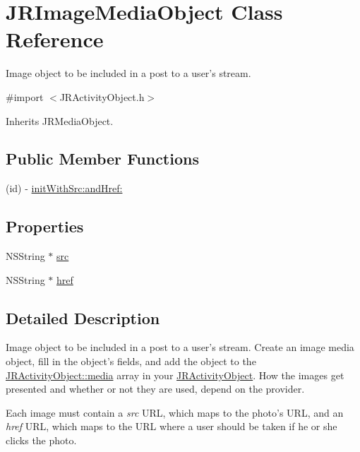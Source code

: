 \hypertarget{interface_j_r_image_media_object}{
\section{JRImageMediaObject Class Reference}
\label{interface_j_r_image_media_object}
}


Image object to be included in a post to a user's stream.  




{\ttfamily \#import $<$JRActivityObject.h$>$}



Inherits JRMediaObject.

\subsection*{Public Member Functions}
\begin{DoxyCompactItemize}
\item 
(id) -\/ \hyperlink{interface_j_r_image_media_object_a8a15f579b784dbdcdaeea9dc1da56cb3}{initWithSrc:andHref:}
\end{DoxyCompactItemize}
\subsection*{Properties}
\begin{DoxyCompactItemize}
\item 
NSString $\ast$ \hyperlink{interface_j_r_image_media_object_aad75823f9189dfca758bc4d4712c3621}{src}
\item 
NSString $\ast$ \hyperlink{interface_j_r_image_media_object_a95642c3f4bc97a112a3ab32beef46f66}{href}
\end{DoxyCompactItemize}


\subsection{Detailed Description}
Image object to be included in a post to a user's stream. Create an image media object, fill in the object's fields, and add the object to the \hyperlink{interface_j_r_activity_object_a2e4ff78f83d0f353f8e0c17ed48ce0ab}{JRActivityObject::media} array in your \hyperlink{interface_j_r_activity_object}{JRActivityObject}. How the images get presented and whether or not they are used, depend on the provider.

Each image must contain a {\itshape src\/} URL, which maps to the photo's URL, and an {\itshape href\/} URL, which maps to the URL where a user should be taken if he or she clicks the photo.

